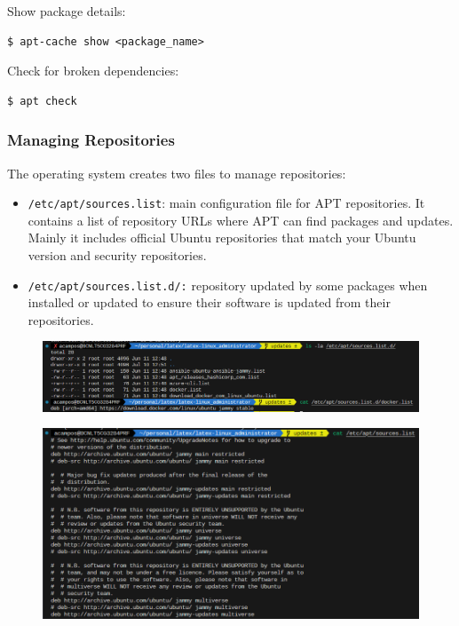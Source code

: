 \documentclass{article}
\newenvironment{codetemplate}[1][]{%
  \mybasecolorbox[#1]
  \itshape
}{%
  \endmybasecolorbox
}
\begin{document}
Show package details:
\begin{codetemplate}
\begin{verbatim}
$ apt-cache show <package_name>
\end{verbatim}
\end{codetemplate}

Check for broken dependencies:
\begin{codetemplate}
\begin{verbatim}
$ apt check
\end{verbatim}
\end{codetemplate}

\subsubsection{Managing Repositories}

The operating system creates two files to manage repositories:

\begin{itemize}
    \item \verb|/etc/apt/sources.list|: main configuration file for APT repositories. It contains a list of repository URLs where APT can find packages and updates. Mainly it includes official Ubuntu repositories that match your Ubuntu version and security repositories.
    \item \verb|/etc/apt/sources.list.d/:| repository updated by some packages when installed or updated to ensure their software is updated from their repositories. 
\end{itemize}

\begin{figure}[H]
    \includegraphics[width=\textwidth]{pictures/apt.png}
    \centering
\end{figure}

\begin{figure}[H]
    \includegraphics[width=\textwidth]{pictures/apt2.png}
    \centering
\end{figure}
\end{document}
